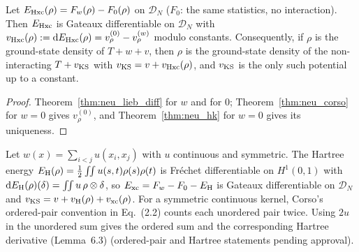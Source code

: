 \begin{theorem}
  \label{thm:neu_ks}
  \leanok
  Let $E_{\rm Hxc}(\rho)=F_w(\rho)-F_0(\rho)$ on $\mathcal D_N$ ($F_0$: the same statistics, no interaction). Then $E_{\rm Hxc}$ is
  Gateaux differentiable on $\mathcal D_N$ with $v_{\rm Hxc}(\rho):=\mathrm dE_{\rm Hxc}(\rho)=v^{(0)}_\rho-v^{(w)}_\rho$ modulo
  constants. Consequently, if $\rho$ is the ground-state density of $T+w+v$, then $\rho$ is the ground-state density of the
  non-interacting $T+v_{\rm KS}$ with $v_{\rm KS}=v+v_{\rm Hxc}(\rho)$, and $v_{\rm KS}$ is the only such potential up to a
  constant.
\end{theorem}
\begin{proof}
  \leanok
  Theorem~\ref{thm:neu_lieb_diff} for $w$ and for $0$; Theorem~\ref{thm:neu_corso} for $w=0$ gives $v^{(0)}_\rho$, and
  Theorem~\ref{thm:neu_hk} for $w=0$ gives its uniqueness.
\end{proof}

\begin{theorem}
  \label{thm:neu_hartree}
  \leanok
  Let $w(x)=\sum_{i<j}u(x_i,x_j)$ with $u$ continuous and symmetric. The Hartree energy
  $E_{\rm H}(\rho)=\tfrac12\iint u(s,t)\rho(s)\rho(t)$ is Fréchet differentiable on $H^1(0,1)$ with
  $\mathrm dE_{\rm H}(\rho)(\delta)=\iint u\,\rho\otimes\delta$, so $E_{\rm xc}=F_w-F_0-E_{\rm H}$ is Gateaux differentiable on
  $\mathcal D_N$ and $v_{\rm KS}=v+v_{\rm H}(\rho)+v_{\rm xc}(\rho)$.
  For a symmetric continuous kernel, Corso's ordered-pair convention in Eq.~(2.2) counts each
  unordered pair twice. Using $2u$ in the unordered sum gives the ordered sum and the
  corresponding Hartree derivative (Lemma~6.3) (ordered-pair and Hartree statements pending approval).
\end{theorem}

